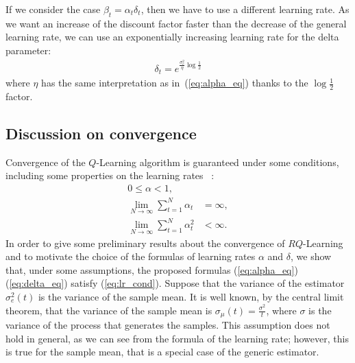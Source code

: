 If we consider the case $\beta_t=\alpha_t\delta_t$, then we have to use a different learning rate. As we want an increase of the discount factor faster than the decrease of the general learning rate, we can use an exponentially increasing learning rate for the delta parameter:
\begin{align}\label{eq:delta_eq}
 \delta_t = e^{\frac{\sigma_e^2}{\eta}\log\frac{1}{2}}
\end{align}
where $\eta$ has the same interpretation as in~(\ref{eq:alpha_eq}) thanks to the $\log\frac{1}{2}$ factor.

\subsection{Discussion on convergence}
Convergence of the $Q$-Learning algorithm is guaranteed under some conditions, including some properties on the learning rates ~\cite{EvenDar2001, watkins1989learning}:
\begin{align}
 0 \leq \alpha < 1,\nonumber \\
 \lim_{N\rightarrow\infty} \sum_{t=1}^{N}\alpha_t & = \infty,\nonumber \\
 \lim_{N\rightarrow\infty} \sum_{t=1}^{N}\alpha_t^2 & < \infty. \label{eq:lr_cond}
\end{align}
In order to give some preliminary results about the convergence of $RQ$-Learning and to motivate the choice of the formulas of learning rates $\alpha$ and $\delta$, we show that, under some assumptions, the proposed formulas (\ref{eq:alpha_eq}) (\ref{eq:delta_eq}) satisfy (\ref{eq:lr_cond}). Suppose that the variance of the estimator $\sigma_e^2(t)$ is the variance of the sample mean. It is well known, by the central limit theorem, that the variance of the sample mean is $\sigma_{\mu}(t)=\frac{\sigma^2}{t}$, where $\sigma$ is the variance of the process that generates the samples.
This assumption does not hold in general, as we can see from the formula of the learning rate; however, this is true for the sample mean, that is a special case of the generic estimator.

